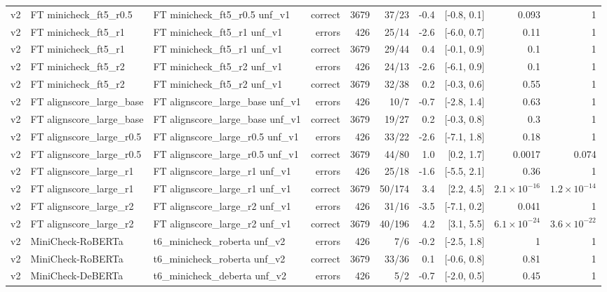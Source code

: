 \begin{scriptsize}
\begin{longtable}{lllrrrrrrr}
v2 & FT minicheck\_ft5\_r0.5 & FT minicheck\_ft5\_r0.5 unf\_v1 & correct & 3679 & 37/23 & -0.4 & [-0.8, 0.1] & 0.093 & 1 \\
v2 & FT minicheck\_ft5\_r1 & FT minicheck\_ft5\_r1 unf\_v1 & errors & 426 & 25/14 & -2.6 & [-6.0, 0.7] & 0.11 & 1 \\
v2 & FT minicheck\_ft5\_r1 & FT minicheck\_ft5\_r1 unf\_v1 & correct & 3679 & 29/44 & 0.4 & [-0.1, 0.9] & 0.1 & 1 \\
v2 & FT minicheck\_ft5\_r2 & FT minicheck\_ft5\_r2 unf\_v1 & errors & 426 & 24/13 & -2.6 & [-6.1, 0.9] & 0.1 & 1 \\
v2 & FT minicheck\_ft5\_r2 & FT minicheck\_ft5\_r2 unf\_v1 & correct & 3679 & 32/38 & 0.2 & [-0.3, 0.6] & 0.55 & 1 \\
v2 & FT alignscore\_large\_base & FT alignscore\_large\_base unf\_v1 & errors & 426 & 10/7 & -0.7 & [-2.8, 1.4] & 0.63 & 1 \\
v2 & FT alignscore\_large\_base & FT alignscore\_large\_base unf\_v1 & correct & 3679 & 19/27 & 0.2 & [-0.3, 0.8] & 0.3 & 1 \\
v2 & FT alignscore\_large\_r0.5 & FT alignscore\_large\_r0.5 unf\_v1 & errors & 426 & 33/22 & -2.6 & [-7.1, 1.8] & 0.18 & 1 \\
v2 & FT alignscore\_large\_r0.5 & FT alignscore\_large\_r0.5 unf\_v1 & correct & 3679 & 44/80 & 1.0 & [0.2, 1.7] & 0.0017 & 0.074 \\
v2 & FT alignscore\_large\_r1 & FT alignscore\_large\_r1 unf\_v1 & errors & 426 & 25/18 & -1.6 & [-5.5, 2.1] & 0.36 & 1 \\
v2 & FT alignscore\_large\_r1 & FT alignscore\_large\_r1 unf\_v1 & correct & 3679 & 50/174 & 3.4 & [2.2, 4.5] & $2.1\times10^{-16}$ & $1.2\times10^{-14}$ \\
v2 & FT alignscore\_large\_r2 & FT alignscore\_large\_r2 unf\_v1 & errors & 426 & 31/16 & -3.5 & [-7.1, 0.2] & 0.041 & 1 \\
v2 & FT alignscore\_large\_r2 & FT alignscore\_large\_r2 unf\_v1 & correct & 3679 & 40/196 & 4.2 & [3.1, 5.5] & $6.1\times10^{-24}$ & $3.6\times10^{-22}$ \\
v2 & MiniCheck-RoBERTa & t6\_minicheck\_roberta unf\_v2 & errors & 426 & 7/6 & -0.2 & [-2.5, 1.8] & 1 & 1 \\
v2 & MiniCheck-RoBERTa & t6\_minicheck\_roberta unf\_v2 & correct & 3679 & 33/36 & 0.1 & [-0.6, 0.8] & 0.81 & 1 \\
v2 & MiniCheck-DeBERTa & t6\_minicheck\_deberta unf\_v2 & errors & 426 & 5/2 & -0.7 & [-2.0, 0.5] & 0.45 & 1 \\

\end{longtable}
\end{scriptsize}
